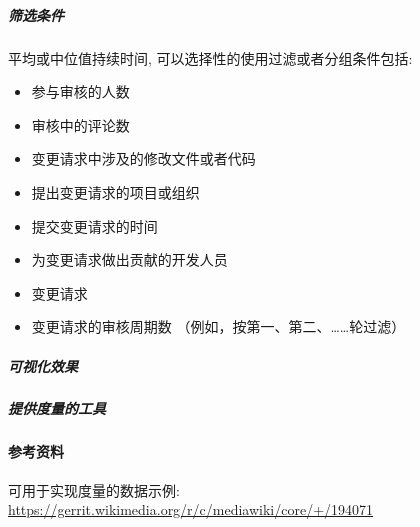 \hypertarget{ux7b5bux9009ux6761ux4ef6}{%
\subparagraph{筛选条件}\label{ux7b5bux9009ux6761ux4ef6}}

平均或中位值持续时间, 可以选择性的使用过滤或者分组条件包括:

\begin{itemize}
\tightlist
\item
  参与审核的人数
\item
  审核中的评论数
\item
  变更请求中涉及的修改文件或者代码
\item
  提出变更请求的项目或组织
\item
  提交变更请求的时间
\item
  为变更请求做出贡献的开发人员
\item
  变更请求
\item
  变更请求的审核周期数 （例如，按第一、第二、\ldots{}\ldots{}轮过滤）
\end{itemize}

\hypertarget{ux53efux89c6ux5316ux6548ux679c}{%
\subparagraph{可视化效果}\label{ux53efux89c6ux5316ux6548ux679c}}

\hypertarget{ux63d0ux4f9bux5ea6ux91cfux7684ux5de5ux5177}{%
\subparagraph{提供度量的工具}\label{ux63d0ux4f9bux5ea6ux91cfux7684ux5de5ux5177}}

\hypertarget{ux53c2ux8003ux8d44ux6599}{%
\paragraph{参考资料}\label{ux53c2ux8003ux8d44ux6599}}

可用于实现度量的数据示例:
\href{https://gerrit.wikimedia.org/r/c/mediawiki/core/+/194071}{https://gerrit.wikimedia.org/r/c/mediawiki/core/+/194071}
